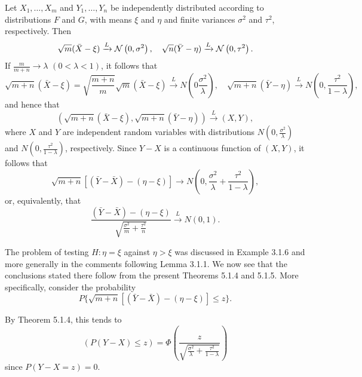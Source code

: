 \begin{example}
	Let $X_1,\ldots,X_m$ and $Y_1,\ldots,Y_n$ be independently distributed according to distributions $F$ and $G$, with means $\xi$ and $\eta$ and finite variances $\sigma^2$ and $\tau^2$, respectively. Then
	\begin{equation*}
		\sqrt{m}(\bar{X}-\xi)\xrightarrow{L}{\mathcal N}\left(0,\sigma^2\right),\quad\sqrt{n}(\bar{Y}-\eta)\xrightarrow{L}{\mathcal N}\left(0,\tau^2\right).
	\end{equation*}
	If $\frac{m}{m+n} \rightarrow \lambda$ $(0<\lambda<1)$, it follows that
	\begin{equation*}
		\sqrt{m+n}(\bar{X}-\xi)=\sqrt{\frac{m+n}{m}}\sqrt{m}(\bar{X}-\xi)\xrightarrow{L}N\left(0\frac{\sigma^2}{\lambda}\right),\quad\sqrt{m+n}(\bar{Y}-\eta)\xrightarrow{L}N\left(0,\frac{\tau^2}{1-\lambda}\right),
	\end{equation*}
	and hence that
	\begin{equation*}
		(\sqrt{m+n}(\bar{X}-\xi),\sqrt{m+n}(\bar{Y}-\eta)) \xrightarrow{L}(X,Y),
	\end{equation*}
	where $X$ and $Y$ are independent random variables with distributions $N\left(0, \frac{\sigma^2}{\lambda}\right)$ and $N\left(0, \frac{\tau^2}{1-\lambda}\right)$, respectively.
	Since $Y-X$ is a continuous function of $(X, Y)$, it follows that
	\begin{equation*}
		\sqrt{m+n}[(\bar{Y}-\bar{X})-(\eta-\xi)] \rightarrow N\left(0, \frac{\sigma^2}{\lambda}+\frac{\tau^2}{1-\lambda}\right),
	\end{equation*}
	or, equivalently, that
	\begin{equation*}
		\frac{(\bar{Y}-\bar{X})-(\eta-\xi)}{\sqrt{\frac{\sigma^2}{m}+\frac{\tau^2}{n}}} \stackrel{L}{\rightarrow} N(0,1) .
	\end{equation*}

	The problem of testing $H: \eta=\xi$ against $\eta>\xi$ was discussed in Example 3.1.6 and more generally in the comments following Lemma 3.1.1. We now see that the conclusions stated there follow from the present Theorems 5.1.4 and 5.1.5. More specifically, consider the probability
	\begin{equation*}
		P\{\sqrt{m+n}[(\bar{Y}-\bar{X})-(\eta-\xi)] \leq z\} .
	\end{equation*}

	By Theorem 5.1.4, this tends to
	\begin{equation*}
		(P(Y-X) \leq z)=\Phi\left(\frac{z}{\sqrt{\frac{\sigma^2}{\lambda}+\frac{\tau^2}{1-\lambda}}}\right)
	\end{equation*}
	since $P(Y-X=z)=0$.
\end{example}


